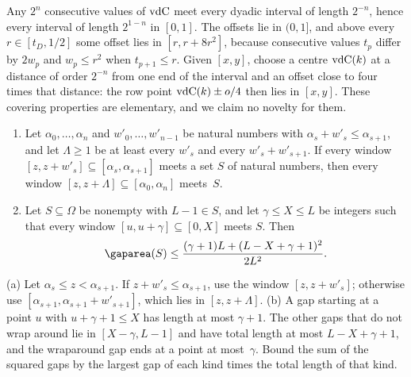 \begin{outline}
Any $2^n$ consecutive values of $\mathrm{vdC}$ meet every dyadic interval of length $2^{-n}$,
hence every interval of length $2^{1-n}$ in $[0,1]$. The offsets lie in $(0,1]$, and above
every $r\in[t_D,1/2]$ some offset lies in $[r,r+8r^2]$, because consecutive values $t_p$
differ by $2w_p$ and $w_p\le r^2$ when $t_{p+1}\le r$. Given $[x,y]$, choose a centre
$\mathrm{vdC}(k)$ at a distance of order $2^{-n}$ from one end of the interval and an offset close
to four times that distance: the row point $\mathrm{vdC}(k)\pm o/4$ then lies in $[x,y]$. These
covering properties are elementary, and we claim no novelty for them.
\end{outline}

\begin{lemma}\label{lem:dense-gaps}
\begin{enumerate}[label=(\alph*)]
\item Let $\alpha_0,\dots,\alpha_n$ and $w'_0,\dots,w'_{n-1}$ be natural numbers with
$\alpha_s+w'_s\le\alpha_{s+1}$, and let $\Lambda\ge1$ be at least every $w'_s$ and every
$w'_s+w'_{s+1}$. If every window $[z,z+w'_s]\subseteq[\alpha_s,\alpha_{s+1}]$ meets a set
$S$ of natural numbers, then every window $[z,z+\Lambda]\subseteq[\alpha_0,\alpha_n]$
meets~$S$.
\item Let $S\subseteq\Omega$ be nonempty with $L-1\in S$, and let $\gamma\le X\le L$ be
integers such that every window $[u,u+\gamma]\subseteq[0,X]$ meets $S$. Then
\[
 \gaparea(S)\le\frac{(\gamma+1)L+(L-X+\gamma+1)^2}{2L^2}.
\]
\end{enumerate}
\end{lemma}

\begin{outline}
(a) Let $\alpha_s\le z<\alpha_{s+1}$. If $z+w'_s\le\alpha_{s+1}$, use the window
$[z,z+w'_s]$; otherwise use $[\alpha_{s+1},\alpha_{s+1}+w'_{s+1}]$, which lies in
$[z,z+\Lambda]$. (b) A gap starting at a point $u$ with $u+\gamma+1\le X$ has length at
most $\gamma+1$. The other gaps that do not wrap around lie in $[X-\gamma,L-1]$ and have
total length at most $L-X+\gamma+1$, and the wraparound gap ends at a point at
most~$\gamma$. Bound the sum of the squared gaps by the largest gap of each kind times the
total length of that kind.
\end{outline}

